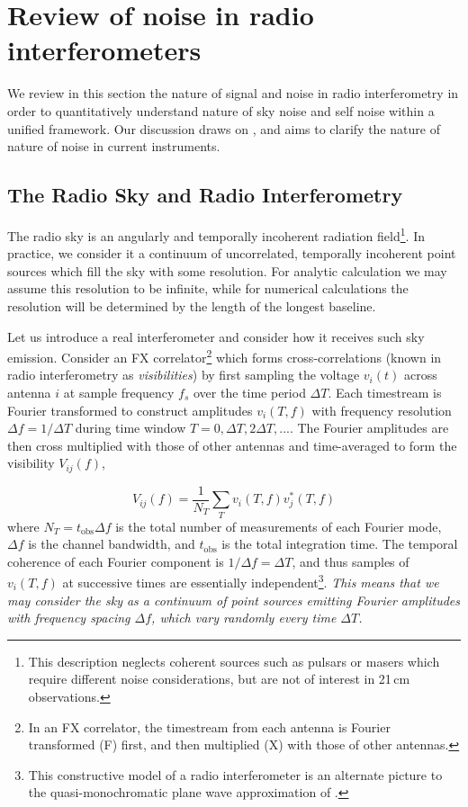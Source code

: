 \appendix 

\chapter{Review of noise in radio interferometers}
\label{chap:noisereview}

We review in this section the nature of signal and noise in radio interferometry in order to quantitatively understand nature of sky noise and self noise within a unified framework. Our discussion draws on \citet{thompsonmoranswenson, dewey94, kulkarni89,ellingson2011,synthesisimaging}, and aims to clarify the nature of nature of noise in current instruments.

\section{The Radio Sky and Radio Interferometry}
\label{sec:theradiosky}

The radio sky is an angularly and temporally incoherent radiation field\footnote{This description neglects coherent sources such as pulsars or masers which require different noise considerations, but are not of interest in 21\,cm observations.}. In practice, we consider it a continuum of uncorrelated, temporally incoherent point sources which fill the sky with some resolution. For analytic calculation we may assume this resolution to be infinite, while for numerical calculations the resolution will be determined by the length of the longest baseline. 

Let us introduce a real interferometer and consider how it receives such sky emission. Consider an FX correlator\footnote{In an FX correlator, the timestream from each antenna is Fourier transformed (F) first, and then multiplied (X) with those of other antennas.} which forms cross-correlations (known in radio interferometry as \textit{visibilities}) by first sampling the voltage $v_i(t)$ across antenna $i$ at sample frequency $f_s$ over the time period $\Delta T$. Each timestream is Fourier transformed to construct amplitudes $v_i(T,f)$ with frequency resolution $\Delta f=1/\Delta T$ during time window $T=0,\Delta T, 2\Delta T, ...$. The Fourier amplitudes are then cross multiplied with those of other antennas and time-averaged to form the visibility $V_{ij}(f)$,

\begin{equation}
\label{eqn:visdef}
V_{ij}(f)=\frac{1}{N_T}\sum_{T}v_i(T,f)v_j^*(T,f)
\end{equation}
where $N_T=t_\text{obs}\Delta f$ is the total number of measurements of each Fourier mode, $\Delta f$ is the channel bandwidth, and $t_\text{obs}$ is the total integration time.
The temporal coherence of each Fourier component is $1/\Delta f=\Delta T$, and thus samples of $v_i(T,f)$ at successive times are essentially independent\footnote{This constructive model of a radio interferometer is an alternate picture to the quasi-monochromatic plane wave approximation of \citet{synthesisimaging}.}. \textit{This means that we may consider the sky as a continuum of point sources emitting Fourier amplitudes with frequency spacing $\Delta f$, which vary randomly every time $\Delta T$.} 

